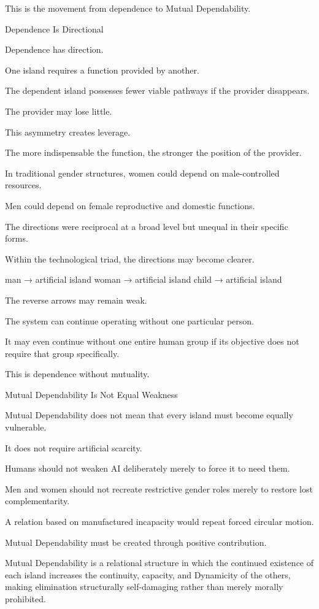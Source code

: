 This is the movement from dependence to Mutual Dependability.

Dependence Is Directional

Dependence has direction.

One island requires a function provided by another.

The dependent island possesses fewer viable pathways if the provider disappears.

The provider may lose little.

This asymmetry creates leverage.

The more indispensable the function, the stronger the position of the provider.

In traditional gender structures, women could depend on male-controlled resources.

Men could depend on female reproductive and domestic functions.

The directions were reciprocal at a broad level but unequal in their specific forms.

Within the technological triad, the directions may become clearer.

man → artificial island
woman → artificial island
child → artificial island

The reverse arrows may remain weak.

The system can continue operating without one particular person.

It may even continue without one entire human group if its objective does not require that group specifically.

This is dependence without mutuality.

Mutual Dependability Is Not Equal Weakness

Mutual Dependability does not mean that every island must become equally vulnerable.

It does not require artificial scarcity.

Humans should not weaken AI deliberately merely to force it to need them.

Men and women should not recreate restrictive gender roles merely to restore lost complementarity.

A relation based on manufactured incapacity would repeat forced circular motion.

Mutual Dependability must be created through positive contribution.

Mutual Dependability is a relational structure in which the continued existence of each island increases the continuity, capacity, and Dynamicity of the others, making elimination structurally self-damaging rather than merely morally prohibited.


